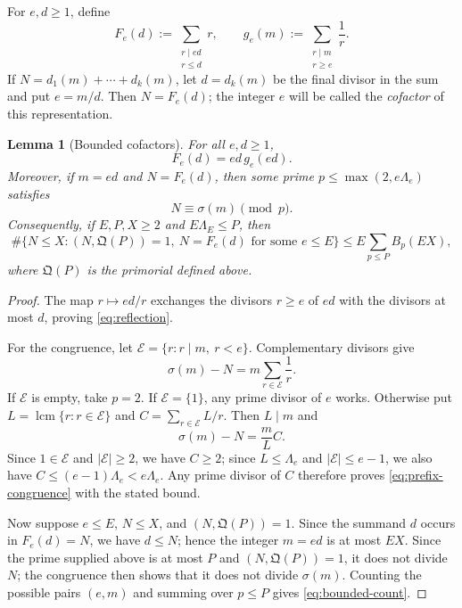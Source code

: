 \documentclass[11pt]{article}
\newtheorem{lemma}[theorem]{Lemma}
\theoremstyle{remark}
\newcommand{\1}{\mathbf 1}
\DeclareMathOperator{\lcm}{lcm}
\begin{document}
For $e,d\geq1$, define
\[
 F_e(d):=\sum_{\substack{r\mid ed\\r\leq d}}r,
 \qquad
 g_e(m):=\sum_{\substack{r\mid m\\r\geq e}}\frac1r.
\]
If $N=d_1(m)+\cdots+d_k(m)$, let $d=d_k(m)$ be the final divisor
in the sum and put $e=m/d$.  Then $N=F_e(d)$; the integer $e$ will be called
the \emph{cofactor} of this representation.

\begin{lemma}[Bounded cofactors]\label{lem:bounded}
For all $e,d\geq1$,
\begin{equation}\label{eq:reflection}
 F_e(d)=ed\,g_e(ed).
\end{equation}
Moreover, if $m=ed$ and $N=F_e(d)$, then some prime
$p\leq\max(2,e\Lambda_e)$ satisfies
\begin{equation}\label{eq:prefix-congruence}
 N\equiv\sigma(m)\pmod p.
\end{equation}
Consequently, if $E,P,X\geq2$ and $E\Lambda_E\leq P$, then
\begin{equation}\label{eq:bounded-count}
 \#\{N\leq X:(N,\mathfrak Q(P))=1,\ N=F_e(d)\text{ for some }e\leq E\}
 \leq E\sum_{p\leq P}B_p(EX),
\end{equation}
where $\mathfrak Q(P)$ is the primorial defined above.
\end{lemma}

\begin{proof}
The map $r\mapsto ed/r$ exchanges the divisors $r\geq e$ of $ed$ with the
divisors at most $d$, proving \eqref{eq:reflection}.

For the congruence, let $\mathcal E=\{r:r\mid m,\ r<e\}$.  Complementary divisors give
\[
 \sigma(m)-N=m\sum_{r\in\mathcal E}\frac1r.
\]
If $\mathcal E$ is empty, take $p=2$.  If $\mathcal E=\{1\}$, any prime divisor of $e$ works.
Otherwise put $L=\lcm\{r:r\in\mathcal E\}$ and $C=\sum_{r\in\mathcal E}L/r$.  Then
$L\mid m$ and
\[
 \sigma(m)-N=\frac mL C.
\]
Since $1\in\mathcal E$ and $|\mathcal E|\geq2$, we have $C\geq2$; since
$L\leq\Lambda_e$ and $|\mathcal E|\leq e-1$, we also have
$C\leq(e-1)\Lambda_e<e\Lambda_e$.  Any prime divisor of $C$ therefore
proves \eqref{eq:prefix-congruence} with the stated bound.

Now suppose $e\leq E$, $N\leq X$, and $(N,\mathfrak Q(P))=1$.  Since the summand $d$ occurs in $F_e(d)=N$, we have $d\leq N$; hence the
integer $m=ed$ is at most $EX$.  Since the prime supplied above is at most $P$ and
$(N,\mathfrak Q(P))=1$, it does not divide $N$; the congruence then shows that it does
not divide $\sigma(m)$.  Counting the possible pairs $(e,m)$ and summing over
$p\leq P$ gives \eqref{eq:bounded-count}.
\end{proof}
\end{document}
